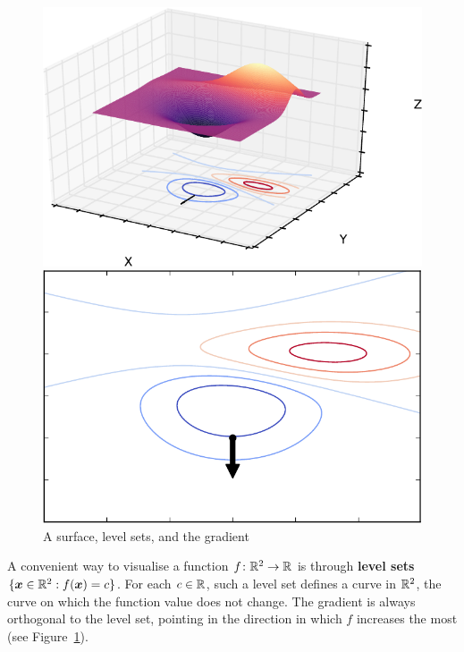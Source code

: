 \documentclass[11pt,a4paper]{memoir}
\begin{document}
\begin{figure}[ht!]
\centering
\begin{minipage}{0.45\textwidth}
\includegraphics[width=\textwidth]{images/3dsurf.pdf}
\end{minipage}
\begin{minipage}{0.45\textwidth}
\includegraphics[scale=0.4]{images/contour.pdf}
\end{minipage}
\caption{A surface, level sets, and the gradient}\label{fig:level}
\end{figure}

A convenient way to visualise a function $f\colon \mathbb{R}^2\to \mathbb{R}$ is through \textbf{level sets} $\{\bm{x}\in \mathbb{R}^2 \mathrel{\mathop{:}} f(\bm{x})=c\}$. For each $c\in \mathbb{R}$, such a level set defines a curve in $\mathbb{R}^2$, the curve on which the function value does not change. The gradient is always orthogonal to the level set, pointing in the direction in which $f$ increases the most (see Figure~\ref{fig:level}).
\end{document}
